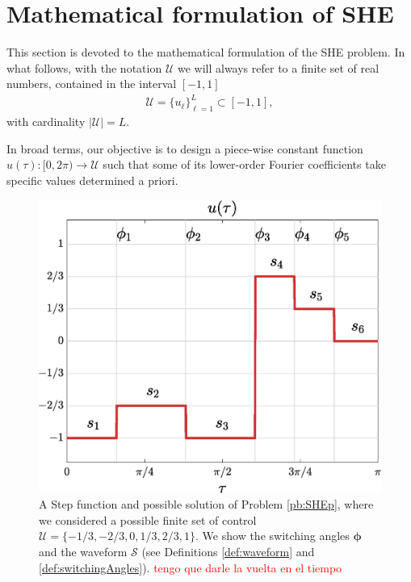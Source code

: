 \section{Mathematical formulation of SHE}\label{Section2}

This section is devoted to the mathematical formulation of the SHE problem. In what follows, with the notation $\mathcal U$ we will always refer to a finite set of real numbers, contained in the interval $[-1,1]$
\begin{align}\label{eq:Udef}
	\mathcal U = \{u_\ell\}_{\ell=1}^L\subset [-1,1],
\end{align}
with cardinality $|\mathcal U| = L$. 

In broad terms, our objective is to design a piece-wise constant function $u(\tau):[0,2\pi)\to\mathcal U$ such that some of its lower-order Fourier coefficients take specific values determined a priori. 

 
\begin{figure}
	\centering
	\includegraphics[scale=0.325]{img/fig01.eps} 
	\caption{A Step function and possible solution of Problem \ref{pb:SHEp}, where we considered a possible finite set of control $\mathcal{U} = \{-1/3, -2/3, 0, 1/3, 2/3, 1\}$. We show the switching angles $\bm{\phi}$ and the waveform $\mathcal{S}$ (see Definitions \ref{def:waveform} and \ref{def:switchingAngles}). \textcolor{red}{tengo que darle la vuelta en el tiempo}}\label{fig:exampleSHE}
\end{figure}

